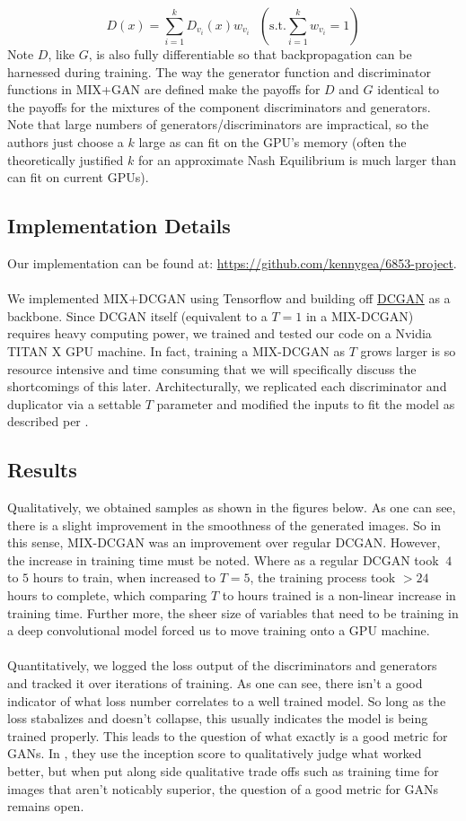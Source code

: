 \documentclass{article}
\begin{document}
\[
  D(x) = \sum\limits_{i = 1}^k D_{v_i}(x) w_{v_i} \mbox{  } (\mbox{s.t.} \sum\limits_{i=1}^k w_{v_i} = 1)
\]
Note $D$, like $G$, is also fully differentiable so that backpropagation can be harnessed during training. The way the generator function and discriminator functions in MIX+GAN are defined make the payoffs for $D$ and $G$ identical to the payoffs for the mixtures of the component discriminators and generators. Note that large numbers of generators/discriminators are impractical, so the authors just choose a $k$ large as can fit on the GPU's memory (often the theoretically justified $k$ for an approximate Nash Equilibrium is much larger than can fit on current GPUs).

\subsection{Implementation Details}
Our implementation can be found at: \url{https://github.com/kennygea/6853-project}.
\\\\
We implemented MIX+DCGAN using Tensorflow and building off \href{https://github.com/carpedm20/DCGAN-tensorflow}{DCGAN} as a backbone. Since DCGAN itself (equivalent to a $T=1$ in a MIX-DCGAN) requires heavy computing power, we trained and tested our code on a Nvidia TITAN X GPU machine. In fact, training a MIX-DCGAN as $T$ grows larger is so resource intensive and time consuming that we will specifically discuss the shortcomings of this later. Architecturally, we replicated each discriminator and duplicator via a settable $T$ parameter and modified the inputs to fit the model as described per \cite{Arora17}. 

\subsection{Results}
Qualitatively, we obtained samples as shown in the figures below. As one can see, there is a slight improvement in the smoothness of the generated images. So in this sense, MIX-DCGAN was an improvement over regular DCGAN. However, the increase in training time must be noted. Where as a regular DCGAN took $~4$ to $5$ hours to train, when increased to $T=5$, the training process took $>24$ hours to complete, which comparing $T$ to hours trained is a non-linear increase in training time. Further more, the sheer size of variables that need to be training in a deep convolutional model forced us to move training onto a GPU machine. 
\\\\
Quantitatively, we logged the loss output of the discriminators and generators and tracked it over iterations of training. As one can see, there isn't a good indicator of what loss number correlates to a well trained model. So long as the loss stabalizes and doesn't collapse, this usually indicates the model is being trained properly. This leads to the question of what exactly is a good metric for GANs. In \cite{Arora17}, they use the inception score to qualitatively judge what worked better, but when put along side qualitative trade offs such as training time for images that aren't noticably superior, the question of a good metric for GANs remains open. 
\end{document}
